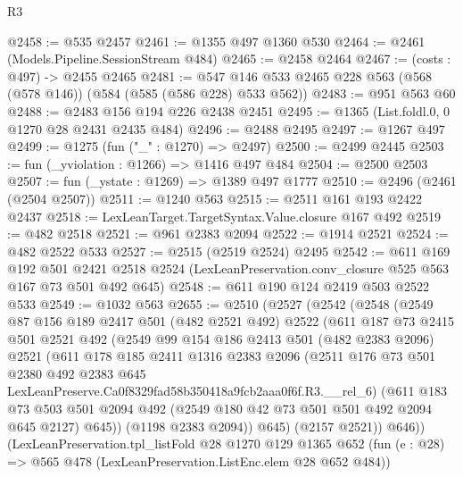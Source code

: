 \begin{lexlean}{R3}
\begin{coremodule}
@2458 := @535 @2457
@2461 := @1355 @497 @1360 @530
@2464 := @2461 (Models.Pipeline.SessionStream @484)
@2465 := @2458 @2464
@2467 := (costs : @497) -> @2455 @2465
@2481 := @547 @146 @533 @2465 @228 @563 (@568 (@578 @146)) (@584 (@585 (@586 @228) @533 @562))
@2483 := @951 @563 @60
@2488 := @2483 @156 @194 @226 @2438 @2451
@2495 := @1365 (List.foldl.{0, 0} @1270 @28 @2431 @2435 @484)
@2496 := @2488 @2495
@2497 := @1267 @497
@2499 := @1275 (fun ("_" : @1270) => @2497)
@2500 := @2499 @2445
@2503 := fun (_yviolation : @1266) => @1416 @497 @484
@2504 := @2500 @2503
@2507 := fun (_ystate : @1269) => @1389 @497 @1777
@2510 := @2496 (@2461 (@2504 @2507))
@2511 := @1240 @563
@2515 := @2511 @161 @193 @2422 @2437
@2518 := LexLeanTarget.TargetSyntax.Value.closure @167 @492
@2519 := @482 @2518
@2521 := @961 @2383 @2094
@2522 := @1914 @2521
@2524 := @482 @2522 @533
@2527 := @2515 (@2519 @2524) @2495
@2542 := @611
    @169
    @192
    @501
    @2421
    @2518
    @2524
    (LexLeanPreservation.conv_closure @525 @563 @167 @73 @501 @492 @645)
@2548 := @611 @190 @124 @2419 @503 @2522 @533
@2549 := @1032 @563
@2655 := @2510
    (@2527
      (@2542
        (@2548
          (@2549
            @87
            @156
            @189
            @2417
            @501
            (@482 @2521 @492)
            @2522
            (@611
              @187
              @73
              @2415
              @501
              @2521
              @492
              (@2549
                @99
                @154
                @186
                @2413
                @501
                (@482 @2383 @2096)
                @2521
                (@611
                  @178
                  @185
                  @2411
                  @1316
                  @2383
                  @2096
                  (@2511
                    @176
                    @73
                    @501
                    @2380
                    @492
                    @2383
                    @645
                    LexLeanPreserve.Ca0f8329fad58b350418a9fcb2aaa0f6f.R3.__rel_6)
                  (@611
                    @183
                    @73
                    @503
                    @501
                    @2094
                    @492
                    (@2549 @180 @42 @73 @501 @501 @492 @2094 @645 @2127)
                    @645))
                (@1198 @2383 @2094))
              @645)
            (@2157 @2521))
          @646))
      (LexLeanPreservation.tpl_listFold
        @28
        @1270
        @129
        @1365
        @652
        (fun (e : @28) => @565 @478 (LexLeanPreservation.ListEnc.elem @28 @652 @484))

\end{coremodule}
\end{lexlean}
